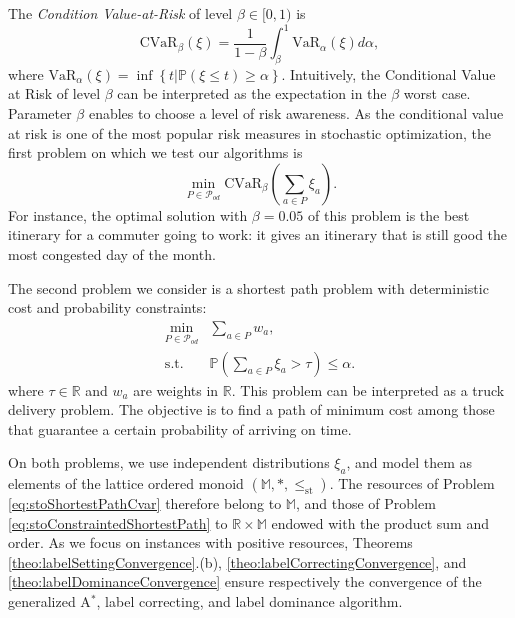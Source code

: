 \documentclass[11pt]{amsart}
\theoremstyle{plain}
\theoremstyle{remark}
\def\R{\mathbb{R}}
\def\P{\mathbb{P}}
\def\bbM{\mathbb{M}}
\newcommand{\leqst}{\leq_{\mathrm{st}}} \newcommand{\nleqst}{\nleq_{st}}
\newcommand{\cvar}{\mathrm{CVaR}}
\begin{document}
The \emph{Condition Value-at-Risk} \cite{rockafellar2000optimization}
 of level $\beta \in [0,1)$ is
\begin{equation*}
	\cvar_{\beta}(\xi) = \frac{1}{1-\beta}\int_{\beta}^{1}\mathrm{VaR}_{\alpha}(\xi)d\alpha,
\end{equation*}
where $\mathrm{VaR}_{\alpha}(\xi) = \inf\left\{t |\P(\xi\leq t) \geq \alpha \right\}$. Intuitively, the Conditional Value at Risk of level $\beta$ can be interpreted as the expectation in the $\beta$ worst case. Parameter $\beta$ enables to choose a level of risk awareness. 
As the conditional value at risk is one of the most popular risk measures in stochastic optimization, the first problem on which we test our algorithms is
\begin{equation}\label{eq:stoShortestPathCvar}
	\min_{P\in \mathcal{P}_{od}} \cvar_{\beta}\left(\sum_{a\in P} \xi_{a}\right).
\end{equation}
For instance, the optimal solution with $\beta=0.05$ of this problem is the best itinerary for a commuter going to work: it gives an itinerary that is still good the most congested day of the month.

The second problem we consider is a shortest path problem with deterministic cost and probability constraints:
\begin{equation}\label{eq:stoConstraintedShortestPath}
	\begin{array}{rl}
		\displaystyle\min_{P\in \mathcal{P}_{od}}& \displaystyle \sum_{a \in P}w_{a}, \\
		\text{s.t.}& \displaystyle\P\left(\sum_{a \in P}\xi_{a} > \tau\right) \leq \alpha.
	\end{array}
\end{equation}
where $\tau \in \R$ and $w_{a}$ are weights in $\R$. This problem can be interpreted as a truck delivery problem. The objective is to find a path of minimum cost among those that guarantee a certain probability of arriving on time. 

On both problems, we use independent distributions $\xi_{a}$, and model them as elements of the lattice ordered monoid $(\bbM,\ast,\leqst)$. The resources of Problem \eqref{eq:stoShortestPathCvar} therefore belong to $\bbM$, and those of Problem \eqref{eq:stoConstraintedShortestPath} to $\R\times\bbM$ endowed with the product sum and order. As we focus on instances with positive resources, Theorems \ref{theo:labelSettingConvergence}.(b), \ref{theo:labelCorrectingConvergence}, and \ref{theo:labelDominanceConvergence} ensure respectively the convergence of the generalized A$^{*}$, label correcting, and label dominance algorithm. 
\end{document}
